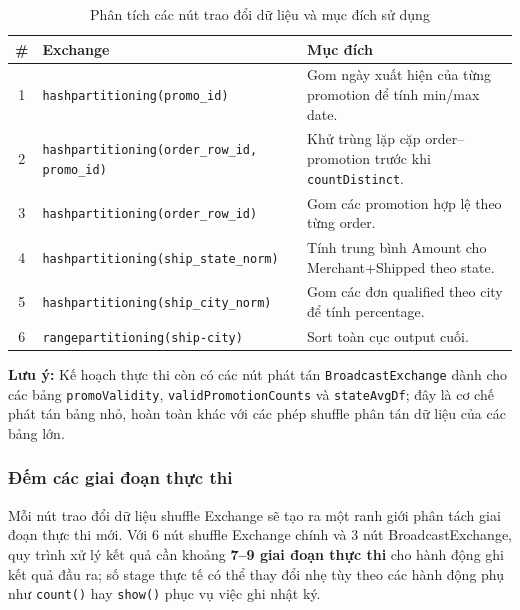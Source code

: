 \begin{table}[H]
\centering
\begin{tabular}{clp{6.5cm}}
\toprule
\textbf{\#} & \textbf{Exchange} & \textbf{Mục đích} \\
\midrule
1 & \texttt{hashpartitioning(promo\_id)} & Gom ngày xuất hiện của từng promotion để tính min/max date. \\
2 & \texttt{hashpartitioning(order\_row\_id, promo\_id)} & Khử trùng lặp cặp order--promotion trước khi \texttt{countDistinct}. \\
3 & \texttt{hashpartitioning(order\_row\_id)} & Gom các promotion hợp lệ theo từng order. \\
4 & \texttt{hashpartitioning(ship\_state\_norm)} & Tính trung bình Amount cho Merchant+Shipped theo state. \\
5 & \texttt{hashpartitioning(ship\_city\_norm)} & Gom các đơn qualified theo city để tính percentage. \\
6 & \texttt{rangepartitioning(ship-city)} & Sort toàn cục output cuối. \\
\bottomrule
\end{tabular}
\caption{Phân tích các nút trao đổi dữ liệu và mục đích sử dụng}
\label{tab:task2_1_exchanges}
\end{table}

\textbf{Lưu ý:} Kế hoạch thực thi còn có các nút phát tán \texttt{BroadcastExchange} dành cho các bảng \texttt{promoValidity}, \texttt{validPromotionCounts} và \texttt{stateAvgDf}; đây là cơ chế phát tán bảng nhỏ, hoàn toàn khác với các phép shuffle phân tán dữ liệu của các bảng lớn.

\subsubsection{Đếm các giai đoạn thực thi}

Mỗi nút trao đổi dữ liệu shuffle Exchange sẽ tạo ra một ranh giới phân tách giai đoạn thực thi mới. Với 6 nút shuffle Exchange chính và 3 nút BroadcastExchange, quy trình xử lý kết quả cần khoảng \textbf{7--9 giai đoạn thực thi} cho hành động ghi kết quả đầu ra; số stage thực tế có thể thay đổi nhẹ tùy theo các hành động phụ như \texttt{count()} hay \texttt{show()} phục vụ việc ghi nhật ký.

